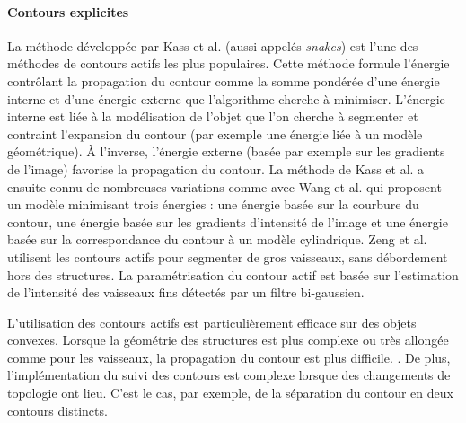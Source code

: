       \paragraph{Contours explicites}
      La méthode développée par Kass et al. \cite{kass1988snakes} (aussi appelés \textit{snakes}) est l'une des méthodes de contours actifs les plus populaires. Cette méthode formule l'énergie contrôlant la propagation du contour comme la somme pondérée d'une énergie interne et d'une énergie externe que l'algorithme cherche à minimiser. L'énergie interne est liée à la modélisation de l'objet que l'on cherche à segmenter et contraint l'expansion du contour (par exemple une énergie liée à un modèle géométrique). À l'inverse, l'énergie externe (basée par exemple sur les gradients de l'image) favorise la propagation du contour. La méthode de Kass et al. a ensuite connu de nombreuses variations comme avec Wang et al. \cite{Wang2012_vessel_level_set} qui proposent un modèle minimisant trois énergies : une énergie basée sur la courbure du contour, une énergie basée sur les gradients d'intensité de l'image et une énergie basée sur la correspondance du contour à un modèle cylindrique. Zeng et al. \cite{Zeng2018_liver_hybrid_active_contour_region_growing} utilisent les contours actifs pour segmenter de gros vaisseaux, sans débordement hors des structures. La paramétrisation du contour actif est basée sur l'estimation de l'intensité des vaisseaux fins détectés par un filtre bi-gaussien.

      L'utilisation des contours actifs est particulièrement efficace sur des objets convexes. Lorsque la géométrie des structures est plus complexe ou très allongée comme pour les vaisseaux, la propagation du contour est plus difficile. . De plus, l'implémentation du suivi des contours est complexe lorsque des changements de topologie ont lieu. C'est le cas, par exemple, de la séparation du contour en deux contours distincts.
